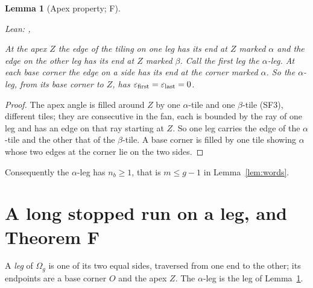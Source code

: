 \documentclass[11pt,reqno]{amsart}
\theoremstyle{plain}
\newtheorem{lemma}[theorem]{Lemma}
\theoremstyle{definition}
\newcommand{\sF}{\textup{\textsf{F}}}
\begin{document}
\begin{lemma}[Apex property; \sF]\label{lem:apex}
{\small\noindent\emph{Lean:} , \par}
At the apex $Z$ the edge of the tiling on one leg has its end at $Z$ marked $\alpha$ and the edge on the other leg has its end at $Z$ marked $\beta$. Call the first leg the \emph{$\alpha$-leg}. At each base corner the edge on a side has its end at the corner marked $\alpha$. So the $\alpha$-leg, from its base corner to $Z$, has $\varepsilon_{\rm first}=\varepsilon_{\rm last}=0$.
\end{lemma}
\begin{proof}
The apex angle is filled around $Z$ by one $\alpha$-tile and one $\beta$-tile (SF3), different tiles; they are consecutive in the fan, each is bounded by the ray of one leg and has an edge on that ray starting at $Z$. So one leg carries the edge of the $\alpha$-tile and the other that of the $\beta$-tile. A base corner is filled by one tile showing $\alpha$ whose two edges at the corner lie on the two sides.
\end{proof}
\noindent Consequently the $\alpha$-leg has $n_b\ge1$, that is $m\le g-1$ in Lemma~\ref{lem:words}.

\section{A long stopped run on a leg, and Theorem F}\label{sec:34}
A \emph{leg} of $\Omega_{g}$ is one of its two equal sides, traversed from one end to the other; its endpoints are a base corner $O$ and the apex $Z$. The $\alpha$-leg is the leg of Lemma~\ref{lem:apex}.
\end{document}
